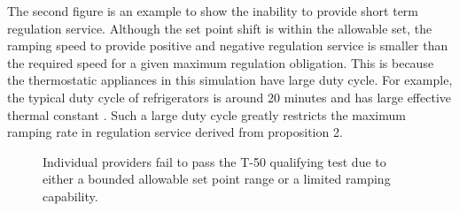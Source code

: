 \documentclass[journal]{IEEEtran}
\begin{document}
The second figure is an example to show the inability to provide short term regulation service. Although the set point shift is within the allowable set, the ramping speed to provide positive and negative regulation service is smaller than the required speed for a given maximum regulation obligation. This is because the thermostatic appliances in this simulation have large duty cycle. For example, the typical duty cycle of refrigerators is around 20 minutes and has large effective thermal constant \cite{Cavallo}. Such a large duty cycle greatly restricts the maximum ramping rate in regulation service derived from proposition 2.
\begin{figure}[hbt]
\label{T-50 test}
\centering
{}
\caption{Individual providers fail to pass the T-50 qualifying test due to either a bounded allowable set point range or a limited ramping capability.}
\end{figure}
\end{document}
